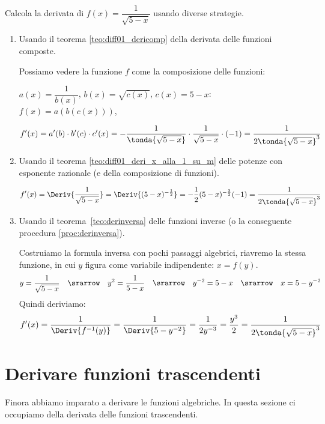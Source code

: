 
\begin{esempio}
Calcola la derivata di \(f(x)=\dfrac{1}{\sqrt{5-x}}\)
usando diverse strategie.

\begin{enumerate} %
\item Usando il teorema \ref{teo:diff01_dericomp} della derivata delle 
funzioni composte.

Possiamo vedere la funzione \(f\) come la composizione delle funzioni: 

\(a(x) = \dfrac{1}{b(x)}\), \quad \(b(x) = \sqrt{c(x)}\), \quad 
\(c(x) = 5 -x\): \quad \(f(x) = a(b(c(x)))\), 

\[f'(x) = a'(b) \cdot b'(c) \cdot c'(x) = 
  - \dfrac{1}{\tonda{\sqrt{5-x}}} \cdot \dfrac{1}{\sqrt{5-x}} \cdot (-1) =
  \dfrac{1}{2 \tonda{\sqrt{5-x}}^3}\] 
\item Usando il teorema \ref{teo:diff01_deri_x_alla_1_su_m} delle potenze con 
esponente razionale (e della composizione di funzioni).

\[f'(x)=\Deriv{\dfrac{1}{\sqrt{5-x}}}=
  \Deriv{(5-x)^{-\frac{1}{2}}}=
  -\dfrac{1}{2}(5-x)^{-\frac{3}{2}}(-1) = 
  \dfrac{1}{2 \tonda{\sqrt{5-x}}^3}\]
\item Usando il teorema~\ref{teo:derinversa} delle funzioni inverse 
(o la conseguente procedura \ref{proc:derinversa}).

Costruiamo la formula inversa con pochi passaggi algebrici, riavremo la 
stessa funzione, in cui \(y\) figura come variabile indipendente: \(x=f(y)\).
\[y = \dfrac{1}{\sqrt{5-x}} \quad \srarrow \quad 
  y^2 = \dfrac{1}{5-x} \quad \srarrow \quad 
  y^{-2} = 5-x \quad \srarrow \quad x = 5-y^{-2}\]
Quindi deriviamo: 
\[f'(x) = \dfrac{1}{\Deriv{f^{-1}(y)}} = \dfrac{1}{\Deriv{5-y^{-2}}} = 
  \dfrac{1}{2y^{-3}} = \dfrac{y^3}{2} = \dfrac{1}{2 \tonda{\sqrt{5-x}}^3}\]
\end{enumerate}
\end{esempio}

\section{Derivare funzioni trascendenti}
\label{sec:diff01_deritrasc}

Finora abbiamo imparato a derivare le funzioni algebriche. In 
questa sezione ci occupiamo della derivata delle funzioni trascendenti.

